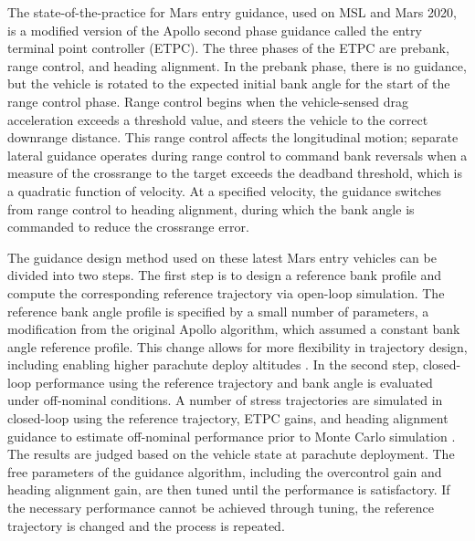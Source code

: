 The state-of-the-practice for Mars entry guidance, used on MSL and Mars 2020, is a modified version of the Apollo second phase guidance \cite{MSL_EDL2} called the entry terminal point controller (ETPC). 
The three phases of the ETPC are prebank, range control, and heading alignment. In the prebank phase, there is no guidance, but the vehicle is rotated to the expected initial bank angle for the start of the range control phase.
Range control begins when the vehicle-sensed drag acceleration exceeds a threshold value, and steers the vehicle to the correct downrange distance. This range control affects the longitudinal motion; separate lateral guidance operates during range control to command bank reversals when a measure of the crossrange to the target exceeds the deadband threshold, which is a quadratic function of velocity. At a specified velocity, the guidance switches from range control to heading alignment, during which the bank angle is commanded to reduce the crossrange error.


The guidance design method used on these latest Mars entry vehicles \cite{MSL_EDL2,M2020_EDL} can be divided into two steps. The first step is to design a reference bank profile and compute the corresponding reference trajectory via open-loop simulation. The reference bank angle profile is specified by a small number of parameters, a modification from the original Apollo algorithm, which assumed a constant bank angle reference profile. This change allows for more flexibility in trajectory design, including enabling higher parachute deploy altitudes \cite{MSL_EDL2}.
In the second step, closed-loop performance using the reference trajectory and bank angle is evaluated under off-nominal conditions. A number of stress trajectories are simulated in closed-loop using the reference trajectory, ETPC gains, and heading alignment guidance to estimate off-nominal performance prior to Monte Carlo simulation \cite{MSL_EDL2}. The results are judged based on the vehicle state at parachute deployment. The free parameters of the guidance algorithm, including the overcontrol gain and heading alignment gain, are then tuned until the performance is satisfactory. If the necessary performance cannot be achieved through tuning, the reference trajectory is changed and the process is repeated. 

